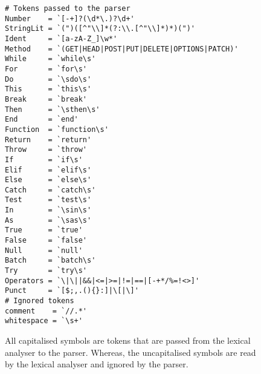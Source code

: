 \begin{figure}[H]
    \begin{verbatim}
# Tokens passed to the parser
Number    = `[-+]?(\d*\.)?\d+'
StringLit = `(")([^"\\]*(?:\\.[^"\\]*)*)(")'
Ident     = `[a-zA-Z_]\w*'
Method    = `(GET|HEAD|POST|PUT|DELETE|OPTIONS|PATCH)'
While     = `while\s'
For       = `for\s'
Do        = `\sdo\s'
This      = `this\s'
Break     = `break'
Then      = `\sthen\s'
End       = `end'
Function  = `function\s'
Return    = `return'
Throw     = `throw'
If        = `if\s'
Elif      = `elif\s'
Else      = `else\s'
Catch     = `catch\s'
Test      = `test\s'
In        = `\sin\s'
As        = `\sas\s'
True      = `true'
False     = `false'
Null      = `null'
Batch     = `batch\s'
Try       = `try\s'
Operators = `\|\||&&|<=|>=|!=|==|[-+*/%=!<>]'
Punct     = `[$;,.(){}:]|\[|\]'
# Ignored tokens
comment    = `//.*'
whitespace = `\s+'
    \end{verbatim}
    
    All capitalised symbols are tokens that are passed from the lexical analyser to the parser. Whereas, the uncapitalised symbols are read by the lexical analyser and ignored by the parser.
\end{figure}

